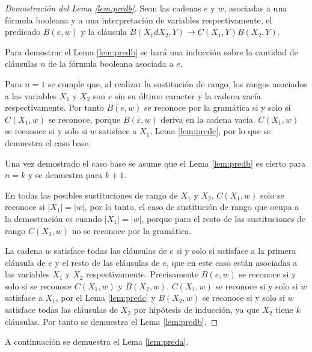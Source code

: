 \begin{proof}[Demostración del Lema \ref{lem:predb}]
    Sean las cadenas $e$ y $w$, asociadas a una fórmula booleana y a una interpretación de variables respectivamente, 
    el predicado $B(e,w)$ y la cláusula $B(X_1dX_2,Y)\to C(X_1,Y) B(X_2,Y)$. 
    
    Para demostrar el Lema \ref{lem:predb}
    se hará una inducción sobre la cantidad de cláusulas $n$ de la fórmula booleana asociada a $e$.
    
    Para $n=1$ se cumple que, al realizar la sustitución de rango, los rangos asociados a las variables $X_1$ y 
    $X_2$ son $e$ sin su último caracter y la cadena vacía respectivamente. Por tanto $B(e,w)$ se reconoce por 
    la gramática si y solo si $C(X_1,w)$ se reconoce, porque $B(\varepsilon, w)$ deriva en la cadena vacía.
    $C(X_1,w)$ se reconoce si y solo si $w$ satisface a $X_1$, Lema \ref{lem:predc}, por lo 
    que se demuestra el caso base.
    
    Una vez demostrado el caso base se asume que el Lema \ref{lem:predb} es cierto para $n=k$ y se demuestra para $k+1$.
    
    En todas las posibles sustituciones de rango de $X_1$ y $X_2$, $C(X_1,w)$ solo se reconoce si $|X_1|=|w|$, por lo tanto, 
    el caso de sustitución de rango que ocupa a la demostración es cuando $|X_1|=|w|$, porque para el resto de las sustituciones 
    de rango $C(X_1,w)$ no se reconoce por la gramática.
    
    La cadena $w$ satisface todas las cláusulas de $e$ si y solo si satisface a la primera cláusula de $e$ y el resto de las cláusulas de $e$, 
    que en este caso están asociadas a las variables $X_1$ y $X_2$ respectivamente.  
    Precisamente $B(e,w)$ se reconoce si y solo si se reconoce $C(X_1,w)$ y $B(X_2,w)$.  $C(X_1,w)$ se reconoce si y solo si $w$ satisface a $X_1$, 
    por el Lema \ref{lem:predc} y $B(X_2,w)$ se reconoce si y solo si $w$ satisface todas las cláusulas de $X_2$ por hipótesis de inducción, ya que $X_2$ tiene $k$ cláusulas. Por tanto se demuestra el Lema \ref{lem:predb}.
\end{proof}

A continuación se demuestra el Lema \ref{lem:preda}.

